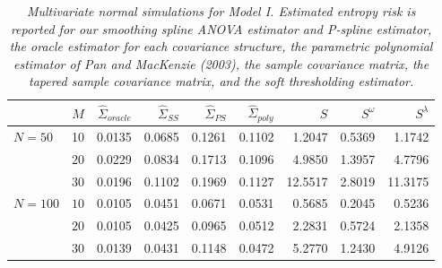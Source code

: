 \bigskip
\setlength{\dashlinedash}{0.5pt}
\setlength{\dashlinegap}{1pt}
\setlength{\arrayrulewidth}{0.2pt}
%
\begin{table}[H]
\centering
\caption{\textit{Multivariate normal simulations for Model I. Estimated entropy risk is reported for our smoothing spline ANOVA estimator and P-spline estimator, the oracle estimator for each covariance structure, the parametric polynomial estimator of Pan and MacKenzie (2003), the sample covariance matrix, the tapered sample covariance matrix, and the soft thresholding estimator.}}
\begin{tabular}{lrrrrrrrr}
 & $M$ & $\hat{\Sigma}_{oracle}$& $\hat{\Sigma}_{SS}$& $\hat{\Sigma}_{PS}$ & $\hat{\Sigma}_{poly}$ & $S$ &$S^\omega$& $S^\lambda$ \\ 
  \hline
$N = 50$ & 10 &0.0135 & 0.0685 & 0.1261 &  0.1102 & 1.2047 & 0.5369 & 1.1742 \\ 
   & $20$ & 0.0229 & 0.0834 & 0.1713 &  0.1096 & 4.9850 & 1.3957 & 4.7796 \\ 
   & $30$ & 0.0196 & 0.1102 & 0.1969 &  0.1127 & 12.5517 & 2.8019 & 11.3175 \\ 
 $N = 100$ & $10$ & 0.0105 & 0.0451 & 0.0671 & 0.0531 & 0.5685 & 0.2045 & 0.5236 \\ 
   & $20$ & 0.0105 &0.0425 & 0.0965 &  0.0512 & 2.2831 & 0.5724 & 2.1358 \\ 
   & $30$ &0.0139 & 0.0431 & 0.1148 &  0.0472 & 5.2770 & 1.2430 & 4.9126 \\ 
   \hline
\end{tabular}
\label{table:simulation-1-entropy-loss-sigma-1}
\end{table}



